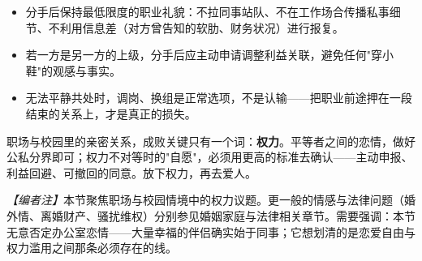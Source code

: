 \begin{itemize}
\item 分手后保持最低限度的职业礼貌：不拉同事站队、不在工作场合传播私事细节、不利用信息差（对方曾告知的软肋、财务状况）进行报复。
\item 若一方是另一方的上级，分手后应主动申请调整利益关联，避免任何"穿小鞋"的观感与事实。
\item 无法平静共处时，调岗、换组是正常选项，不是认输——把职业前途押在一段结束的关系上，才是真正的损失。
\end{itemize}

\begin{tcolorbox}[colback=pink!5!white,colframe=red!50!black,title=核心原则]
职场与校园里的亲密关系，成败关键只有一个词：\textbf{权力}。平等者之间的恋情，做好公私分界即可；权力不对等时的"自愿"，必须用更高的标准去确认——主动申报、利益回避、可撤回的同意。放下权力，再去爱人。
\end{tcolorbox}

\noindent\textit{【编者注】}本节聚焦职场与校园情境中的权力议题。更一般的情感与法律问题（婚外情、离婚财产、骚扰维权）分别参见婚姻家庭与法律相关章节。需要强调：本节无意否定办公室恋情——大量幸福的伴侣确实始于同事；它想划清的是恋爱自由与权力滥用之间那条必须存在的线。
